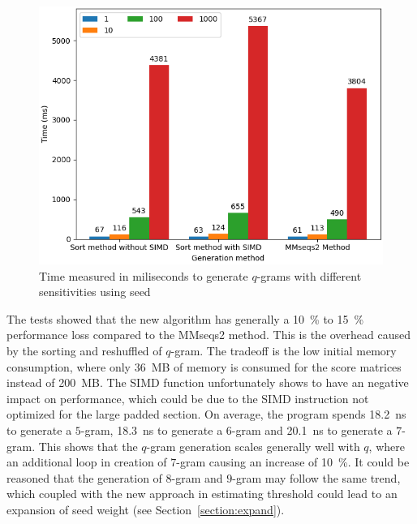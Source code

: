 \documentclass[twoside,a4paper,bsc]{master}
\newcommand{\Qgram}[1]{\(#1\)-gram}
\begin{document}
\begin{figure}
\centering
\includegraphics[scale=0.6]{graphics/gen_w7.png}
\caption{Time measured in miliseconds to generate \Qgram{q}s with
different sensitivities using seed }
\label{fig:genw7}
\end{figure}
The tests showed that the new algorithm has generally a 10~\% to 15~\%
performance loss compared to the MMseqs2 method. This is the overhead
caused by the sorting and reshuffled of \Qgram{q}. The tradeoff is the low
initial memory consumption, where only 36~MB of memory is consumed for the
score matrices instead of 200~MB. The SIMD function unfortunately shows to
have an negative impact on performance, which could be due to the SIMD
instruction not optimized for the large padded section. On average, the
program spends 18.2~ns to generate a \Qgram{5}, 18.3~ns to generate a
\Qgram{6} and 20.1~ns to generate a \Qgram{7}. This shows that the
\Qgram{q}
generation scales generally well with \(q\), where an additional loop in
creation of \Qgram{7} causing an increase of 10~\%. It could be reasoned
that the generation of \Qgram{8} and \Qgram{9} may follow the same trend,
which coupled with the new approach in estimating threshold could lead to
an expansion of seed weight (see Section~\ref{section:expand}).
\end{document}

